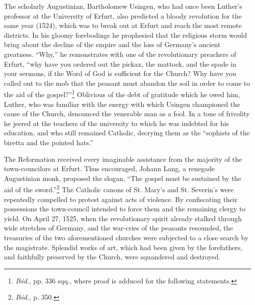 The scholarly Augustinian, Bartholomew Usingen, who had once
been Luther’s professor at the University of Erfurt, also predicted
a bloody revolution for the same year (1524), which was to break
out at Erfurt and reach the most remote districts. In his gloomy forebodings
he prophesied that the religious storm would bring about
the decline of the empire and the loss of Germany’s ancient greatness.
“Why,” he remonstrates with one of the revolutionary preachers
of Erfurt, “why have you ordered out the pickax, the mattock, and
the spade in your sermons, if the Word of God is sufficient for the
Church? Why have you called out to the mob that the peasant must
abandon the soil in order to come to the aid of the gospel?”\footnote
{\textit{Ibid.}, pp. 336 sqq., where proof is adduced for the following statements.}
Oblivious of the debt of gratitude which he owed him, Luther, who
was familiar with the energy with which Usingen championed the
cause of the Church, denounced the venerable man as a fool. In a tone
of frivolity he jeered at the teachers of the university to which he was
indebted for his education, and who still remained Catholic, decrying
them as the “sophists of the biretta and the pointed hats.”

The Reformation received every imaginable assistance from the
majority of the town-councilors at Erfurt. Thus encouraged, Johann
Lang, a renegade Augustinian monk, proposed the slogan, “The
gospel must be sustained by the aid of the sword.”\footnote{\textit{Ibid.}, p. 350.}
The Catholic
canons of St. Mary’s and St. Severin’s were repeatedly compelled
to protest against acts of violence. By confiscating their possessions
the town-council intended to force them and the remaining clergy
to yield. On April 27, 1525, when the revolutionary spirit already
stalked through wide stretches of Germany, and the war-cries of
the peasants resounded, the treasuries of the two aforementioned
churches were subjected to a close search by the magistrate. Splendid
works of art, which had been given by the forefathers, and faithfully
preserved by the Church, were squandered and destroyed.

